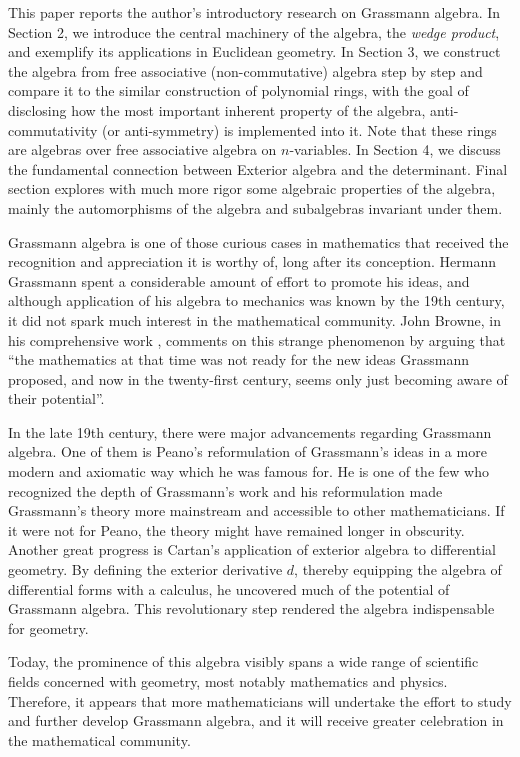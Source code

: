 \documentclass[12pt]{article}
\numberwithin{theorem}{section}
\numberwithin{equation}{theorem}
\begin{document}
This paper reports the author’s introductory research on Grassmann algebra. In Section 2, we introduce the central machinery of the algebra, the \emph{wedge product}, and exemplify its applications in Euclidean geometry. In Section 3, we construct the algebra from free associative (non-commutative) algebra step by step and compare it to the similar construction of polynomial rings, with the goal of disclosing how the most important inherent property of the algebra, anti-commutativity (or anti-symmetry) is implemented into it. Note that these rings are algebras over free associative algebra on $n$-variables. In Section 4, we discuss the fundamental connection between Exterior algebra and the determinant. Final section explores with much more rigor some algebraic properties of the algebra, mainly the automorphisms of the algebra and subalgebras invariant under them.

Grassmann algebra is one of those curious cases in mathematics that received the recognition and appreciation it is worthy of, long after its conception. Hermann Grassmann spent a considerable amount of effort to promote his ideas, and although application of his algebra to mechanics was known by the 19th century, it did not spark much interest in the mathematical community. John Browne, in his comprehensive work \cite{browne}, comments on this strange phenomenon by arguing that “the mathematics at that time was not ready for the new ideas Grassmann proposed, and now in the twenty-first century, seems only just becoming aware of their potential”. 

In the late 19th century, there were major advancements regarding Grassmann algebra. One of them is Peano’s reformulation of Grassmann’s ideas in a more modern and axiomatic way which he was famous for. He is one of the few who recognized the depth of Grassmann’s work and his reformulation made Grassmann’s theory more mainstream and accessible to other mathematicians. If it were not for Peano, the theory might have remained longer in obscurity. Another great progress is Cartan’s application of exterior algebra to differential geometry. By defining the exterior derivative $d$, thereby equipping the algebra of differential forms with a calculus, he uncovered much of the potential of Grassmann algebra. This revolutionary step rendered the algebra indispensable for geometry. 

Today, the prominence of this algebra visibly spans a wide range of scientific fields concerned with geometry, most notably mathematics and physics. Therefore, it appears that more mathematicians will undertake the effort to study and further develop Grassmann algebra, and it will receive greater celebration in the mathematical community.
\end{document}
